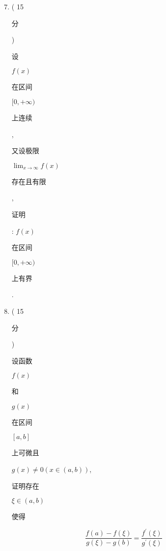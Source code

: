 \documentclass[10pt]{article}
\begin{document}
\begin{enumerate}
  \setcounter{enumi}{6}
  \item ( 15 \begin{CJK}{UTF8}{mj}分\end{CJK}) \begin{CJK}{UTF8}{mj}设\end{CJK} $f(x)$ \begin{CJK}{UTF8}{mj}在区间\end{CJK} $[0,+\infty)$ \begin{CJK}{UTF8}{mj}上连续\end{CJK}, \begin{CJK}{UTF8}{mj}又设极限\end{CJK} $\lim _{x \rightarrow \infty} f(x)$ \begin{CJK}{UTF8}{mj}存在且有限\end{CJK}, \begin{CJK}{UTF8}{mj}证明\end{CJK}: $f(x)$ \begin{CJK}{UTF8}{mj}在区间\end{CJK} $[0,+\infty)$ \begin{CJK}{UTF8}{mj}上有界\end{CJK}.

  \item ( 15 \begin{CJK}{UTF8}{mj}分\end{CJK}) \begin{CJK}{UTF8}{mj}设函数\end{CJK} $f(x)$ \begin{CJK}{UTF8}{mj}和\end{CJK} $g(x)$ \begin{CJK}{UTF8}{mj}在区间\end{CJK} $[a, b]$ \begin{CJK}{UTF8}{mj}上可微且\end{CJK} $g(x) \neq 0(x \in(a, b))$, \begin{CJK}{UTF8}{mj}证明存在\end{CJK} $\xi \in(a, b)$ \begin{CJK}{UTF8}{mj}使得\end{CJK}

\end{enumerate}
$$
\frac{f(a)-f(\xi)}{g(\xi)-g(b)}=\frac{f^{\prime}(\xi)}{g^{\prime}(\xi)}
$$
\end{document}
